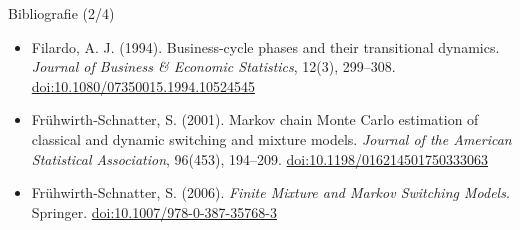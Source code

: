\begin{frame}{Bibliografie (2/4)}
\begin{itemize}
    \item Filardo, A. J. (1994). Business-cycle phases and their transitional dynamics. \textit{Journal of Business \& Economic Statistics}, 12(3), 299--308. \href{https://doi.org/10.1080/07350015.1994.10524545}{doi:10.1080/07350015.1994.10524545}
    \item Frühwirth-Schnatter, S. (2001). Markov chain Monte Carlo estimation of classical and dynamic switching and mixture models. \textit{Journal of the American Statistical Association}, 96(453), 194--209. \href{https://doi.org/10.1198/016214501750333063}{doi:10.1198/016214501750333063}
    \item Frühwirth-Schnatter, S. (2006). \textit{Finite Mixture and Markov Switching Models}. Springer. \href{https://doi.org/10.1007/978-0-387-35768-3}{doi:10.1007/978-0-387-35768-3}
\end{itemize}
\end{frame}

